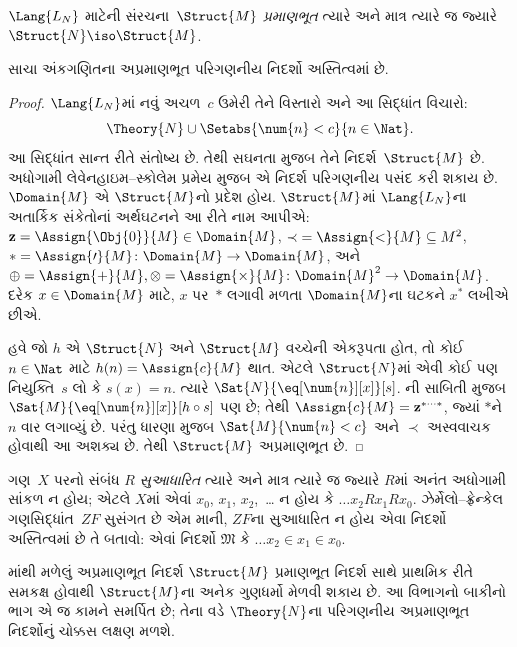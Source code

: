 \begin{defn}
$\Lang{L_N}$ માટેની સંરચના~$\Struct{M}$
\emph{પ્રમાણભૂત} ત્યારે અને માત્ર ત્યારે
જ જ્યારે $\Struct{N} \iso \Struct{M}$.
\end{defn}

\begin{thm}
સાચા અંકગણિતના અપ્રમાણભૂત
પરિગણનીય નિદર્શો અસ્તિત્વમાં છે.
\end{thm}

\begin{proof}
$\Lang{L_N}$માં નવું અચળ~$c$
ઉમેરી તેને વિસ્તારો અને આ સિદ્ધાંત વિચારો:
\[
\Theory{N} \cup \Setabs{\num{n} < c}{n \in \Nat}.
\]
આ સિદ્ધાંત સાન્ત રીતે સંતોષ્ય છે.
તેથી સઘનતા મુજબ તેને નિદર્શ~$\Struct{M}$
છે. અધોગામી લેવેનહાઇમ--સ્કોલેમ પ્રમેય
મુજબ એ નિદર્શ પરિગણનીય પસંદ
કરી શકાય છે. $\Domain{M}$ એ
$\Struct{M}$નો પ્રદેશ હોય.
$\Struct{M}$માં $\Lang{L_N}$ના
અતાર્કિક સંકેતોનાં અર્થઘટનને આ રીતે
નામ આપીએ: $\mathbf{z} = \Assign{\Obj{0}}{M} \in \Domain{M}$,
${\prec} = \Assign{<}{M} \subseteq M^2$,
$* = \Assign{\prime}{M} \colon
\Domain{M} \to \Domain{M}$, અને
$\oplus = \Assign{+}{M}, \otimes =
\Assign{\times}{M} \colon \Domain{M}^2 \to \Domain{M}$.
દરેક $x \in \Domain{M}$ માટે,
$x$ પર~$*$ લગાવી મળતા
$\Domain{M}$ના ઘટકને $x^*$
લખીએ છીએ.

હવે જો $h$ એ $\Struct{N}$ અને
$\Struct{M}$ વચ્ચેની એકરૂપતા હોત,
તો કોઈ $n \in \Nat$ માટે
$h(n) = \Assign{c}{M}$ થાત.
એટલે $\Struct{N}$માં એવી
કોઈ પણ નિયુક્તિ~$s$ લો કે
$s(x) = n$. ત્યારે
$\Sat{N}{\eq[\num{n}][x]}[s]$.
ની સાબિતી
મુજબ $\Sat{M}{\eq[\num{n}][x]}[h \circ s]$
પણ છે; તેથી $\Assign{c}{M} =
\mathbf{z}^{*\cdots *}$, જ્યાં
$*$ને $n$ વાર લગાવ્યું છે.
પરંતુ ધારણા મુજબ
$\Sat{M}{\num{n} < c}$ અને
$\prec$ અસ્વવાચક હોવાથી
આ અશક્ય છે. તેથી
$\Struct{M}$ અપ્રમાણભૂત છે.
\end{proof}

\begin{prob}
ગણ~$X$ પરનો સંબંધ $R$
\emph{સુઆધારિત} ત્યારે અને માત્ર ત્યારે
જ જ્યારે $R$માં અનંત અધોગામી
સાંકળ ન હોય; એટલે $X$માં
એવાં $x_0$, $x_1$, $x_2$,~\dots
ન હોય કે $\dots x_2Rx_1Rx_0$.
ઝેર્મેલો--ફ્રેન્કેલ ગણસિદ્ધાંત~$ZF$
સુસંગત છે એમ માની, $ZF$ના
સુઆધારિત ન હોય એવા નિદર્શો
અસ્તિત્વમાં છે તે બતાવો:
એવાં નિદર્શો $\mathfrak{M}$
કે $\dots x_2 \in x_1 \in x_0$.
\end{prob}

માંથી મળેલું
અપ્રમાણભૂત નિદર્શ $\Struct{M}$
પ્રમાણભૂત નિદર્શ સાથે
પ્રાથમિક રીતે સમકક્ષ હોવાથી
$\Struct{M}$ના અનેક ગુણધર્મો
મેળવી શકાય છે. આ વિભાગનો
બાકીનો ભાગ એ જ કામને સમર્પિત
છે; તેના વડે $\Theory{N}$ના
પરિગણનીય અપ્રમાણભૂત
નિદર્શોનું ચોક્કસ લક્ષણ
મળશે.


